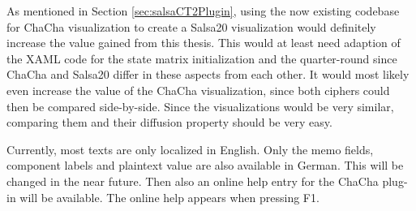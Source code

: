 \begin{description}[style=nextline]
\item[Salsa20 visualization]

As mentioned in Section \ref{sec:salsaCT2Plugin}, using the now existing codebase for ChaCha visualization to create a Salsa20 visualization would definitely increase the value gained from this thesis. This would at least need adaption of the XAML code for the state matrix initialization and the quarter-round since ChaCha and Salsa20 differ in these aspects from each other. It would most likely even increase the value of the ChaCha visualization, since both ciphers could then be compared side-by-side. Since the visualizations would be very similar, comparing them and their diffusion property should be very easy.

\item[Localization and online help]

Currently, most texts are only localized in English. Only the memo fields, component labels and plaintext value are also available in German.
This will be changed in the near future. Then also an online help entry for the ChaCha plug-in will be available. The online help appears when pressing F1.

\end{description}

